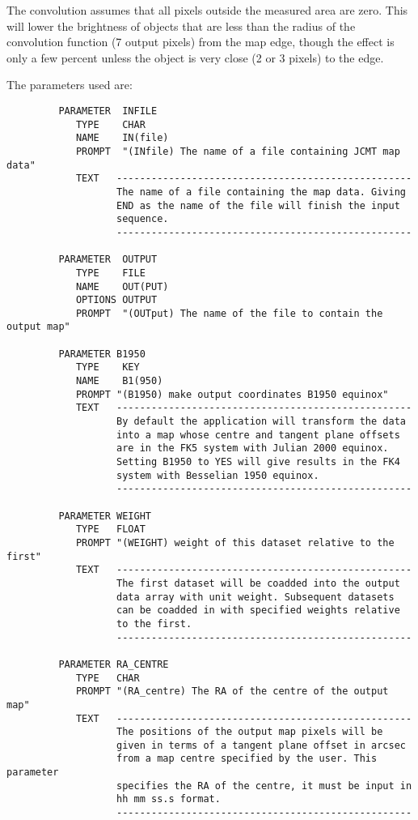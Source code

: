 \documentclass[twoside,11pt]{article}
\renewcommand{\_}{\texttt{\symbol{95}}}
\begin{document}
The convolution assumes that all pixels outside the measured  area are
zero. This will lower the brightness of objects that are  less than
the radius of the convolution function (7 output pixels)  from the map
edge, though the effect is only a few percent unless  the object is
very close (2 or 3 pixels) to the edge.

\goodbreak

The parameters used are:

\begin{small}
\begin{verbatim}
         PARAMETER  INFILE
            TYPE    CHAR
            NAME    IN(file)
            PROMPT  "(INfile) The name of a file containing JCMT map data"
            TEXT   ---------------------------------------------------
                   The name of a file containing the map data. Giving
                   END as the name of the file will finish the input
                   sequence.
                   ---------------------------------------------------

         PARAMETER  OUTPUT
            TYPE    FILE
            NAME    OUT(PUT)
            OPTIONS OUTPUT
            PROMPT  "(OUTput) The name of the file to contain the output map"

         PARAMETER B1950
            TYPE    KEY
            NAME    B1(950)
            PROMPT "(B1950) make output coordinates B1950 equinox"
            TEXT   ---------------------------------------------------
                   By default the application will transform the data
                   into a map whose centre and tangent plane offsets
                   are in the FK5 system with Julian 2000 equinox.
                   Setting B1950 to YES will give results in the FK4
                   system with Besselian 1950 equinox.
                   ---------------------------------------------------

         PARAMETER WEIGHT
            TYPE   FLOAT
            PROMPT "(WEIGHT) weight of this dataset relative to the first"
            TEXT   ---------------------------------------------------
                   The first dataset will be coadded into the output
                   data array with unit weight. Subsequent datasets
                   can be coadded in with specified weights relative
                   to the first.
                   ---------------------------------------------------

         PARAMETER RA_CENTRE
            TYPE   CHAR
            PROMPT "(RA_centre) The RA of the centre of the output map"
            TEXT   ---------------------------------------------------
                   The positions of the output map pixels will be
                   given in terms of a tangent plane offset in arcsec
                   from a map centre specified by the user. This parameter
                   specifies the RA of the centre, it must be input in
                   hh mm ss.s format.
                   ---------------------------------------------------


\end{verbatim}
\end{small}
\end{document}
